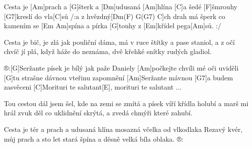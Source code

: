 
Cesta je [Am]prach a [G]\null šterk a [Dm]udusaná [Am]hlína 
[C]a šedé [F]\null šmrouhy [G7]kreslí do vla[C]sů
/:a z hvězdný[Dm(F) G(G7) C]ch drah má šperk co kamením
se [Em Am]spína a pírka [G]touhy z [Em]křídel pega[Am]sů. :/

Cesta je bič, je zlá jak pouliční dáma, má 
v ruce štítky a pase staniol, a z očí chvíč jí plá,
když háže do neznáma, dvě křehké snítky
rudých gladiol.

®:[G]Seržante písek je bílý jak paže Daniely
[Am]počkejte chvíli mé oči uviděli
[G]tu strašne dávnou vteřinu zapomnění
[Am]Seržante mávnou [G7]a budem zasvěceni
[C]Morituri te salutant[E], morituri te salutant ...

Tou cestou dál jsem šel, kde na zemi se zmítá
a písek víří křídla holubí a marš mi hrál 
zvuk děl co uklidnění skrýtá,
a zvedá chmýři které zahubí.

Cesta je tér a prach a udusaná hlína
mosazná včelka od vlkodlaka
Rezavý kvér, můj prach a sto let stará špína a děsně velká bíla oblaka. ®: